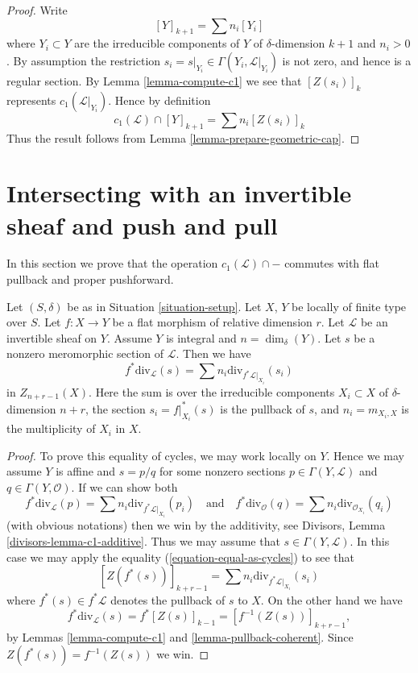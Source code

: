 \begin{proof}
Write
$$
[Y]_{k + 1} = \sum n_i[Y_i]
$$
where $Y_i \subset Y$ are the irreducible components of
$Y$ of $\delta$-dimension $k + 1$ and $n_i > 0$.
By assumption the restriction
$s_i = s|_{Y_i} \in \Gamma(Y_i, \mathcal{L}|_{Y_i})$ is not
zero, and hence is a regular section. By Lemma \ref{lemma-compute-c1}
we see that $[Z(s_i)]_k$ represents $c_1(\mathcal{L}|_{Y_i})$.
Hence by definition
$$
c_1(\mathcal{L}) \cap [Y]_{k + 1} = \sum n_i[Z(s_i)]_k
$$
Thus the result follows from Lemma \ref{lemma-prepare-geometric-cap}.
\end{proof}




\section{Intersecting with an invertible sheaf and push and pull}
\label{section-intersecting-with-divisors-push-pull}

\noindent
In this section we prove that the operation $c_1(\mathcal{L}) \cap -$
commutes with flat pullback and proper pushforward.

\begin{lemma}
\label{lemma-prepare-flat-pullback-cap-c1}
Let $(S, \delta)$ be as in Situation \ref{situation-setup}.
Let $X$, $Y$ be locally of finite type over $S$.
Let $f : X \to Y$ be a flat morphism of relative dimension $r$.
Let $\mathcal{L}$ be an invertible sheaf on $Y$.
Assume $Y$ is integral and $n = \dim_\delta(Y)$.
Let $s$ be a nonzero meromorphic section of $\mathcal{L}$.
Then we have
$$
f^*\text{div}_\mathcal{L}(s) = \sum n_i\text{div}_{f^*\mathcal{L}|_{X_i}}(s_i)
$$
in $Z_{n + r - 1}(X)$. Here the sum is over the irreducible
components $X_i \subset X$ of $\delta$-dimension $n + r$,
the section $s_i = f|_{X_i}^*(s)$ is the pullback of $s$, and
$n_i = m_{X_i, X}$ is the multiplicity of $X_i$ in $X$.
\end{lemma}

\begin{proof}
To prove this equality of cycles, we may work locally on $Y$.
Hence we may assume $Y$ is affine and $s = p/q$ for some nonzero
sections $p \in \Gamma(Y, \mathcal{L})$ and $q \in \Gamma(Y, \mathcal{O})$.
If we can show both
$$
f^*\text{div}_\mathcal{L}(p) =
\sum n_i\text{div}_{f^*\mathcal{L}|_{X_i}}(p_i)
\quad\text{and}\quad
f^*\text{div}_\mathcal{O}(q) =
\sum n_i\text{div}_{\mathcal{O}_{X_i}}(q_i)
$$
(with obvious notations) then we win by the
additivity, see Divisors, Lemma \ref{divisors-lemma-c1-additive}.
Thus we may assume that $s \in \Gamma(Y, \mathcal{L})$.
In this case we may apply the equality
(\ref{equation-equal-as-cycles}) to see that
$$
[Z(f^*(s))]_{k + r - 1} =
\sum n_i\text{div}_{f^*\mathcal{L}|_{X_i}}(s_i)
$$
where $f^*(s) \in f^*\mathcal{L}$ denotes the pullback of $s$ to $X$.
On the other hand we have
$$
f^*\text{div}_\mathcal{L}(s) = f^*[Z(s)]_{k - 1}
= [f^{-1}(Z(s))]_{k + r - 1},
$$
by Lemmas \ref{lemma-compute-c1} and \ref{lemma-pullback-coherent}.
Since $Z(f^*(s)) = f^{-1}(Z(s))$ we win.
\end{proof}

